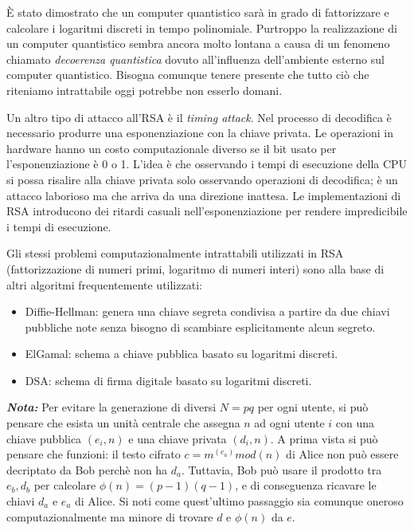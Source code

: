 È stato dimostrato che un computer quantistico sarà in grado di fattorizzare e calcolare i logaritmi discreti in tempo polinomiale. Purtroppo la realizzazione di un computer quantistico sembra ancora molto lontana a causa di un fenomeno chiamato \textit{decoerenza quantistica} dovuto all'influenza dell'ambiente esterno sul computer quantistico. Bisogna comunque tenere presente che tutto ciò che riteniamo intrattabile oggi potrebbe non esserlo domani.

Un altro tipo di attacco all'RSA è il \textit{timing attack}. Nel processo di decodifica è necessario produrre una esponenziazione con la chiave privata. Le operazioni in hardware hanno un costo computazionale diverso se il bit usato per l'esponenziazione è 0 o 1. L'idea è che osservando i tempi di esecuzione della CPU si possa risalire alla chiave privata solo osservando operazioni di decodifica; è un attacco laborioso ma che arriva da una direzione inattesa. Le implementazioni di RSA introducono dei ritardi casuali nell'esponenziazione per rendere impredicibile i tempi di esecuzione.

Gli stessi problemi computazionalmente intrattabili utilizzati in RSA (fattorizzazione di numeri primi, logaritmo di numeri interi) sono alla base di altri algoritmi frequentemente utilizzati:
\begin{itemize}
	\item Diffie-Hellman: genera una chiave segreta condivisa a partire da due chiavi pubbliche note senza bisogno di scambiare esplicitamente alcun segreto.
	\item ElGamal: schema a chiave pubblica basato su logaritmi discreti.
	\item DSA: schema di firma digitale basato su logaritmi discreti.
\end{itemize}

\textbf{\textit{Nota:}} Per evitare la generazione di diversi $N=pq$ per ogni utente, si può pensare che esista un unità centrale che assegna $n$ ad ogni utente $i$ con una chiave pubblica $(e_i, n)$ e una chiave privata $(d_i, n)$. A prima vista si può pensare che funzioni: il testo cifrato $c=m^(e_{a})mod(n)$ di Alice non può essere decriptato da Bob perchè non ha $d_a$. Tuttavia, Bob può usare il prodotto tra $e_b, d_b$ per calcolare $\phi(n)=(p-1)(q-1)$, e di conseguenza ricavare le chiavi $d_a$ e $e_a$ di Alice. Si noti come quest'ultimo passaggio sia comunque oneroso computazionalmente ma minore di trovare $d$ e $\phi(n)$ da $e$.

